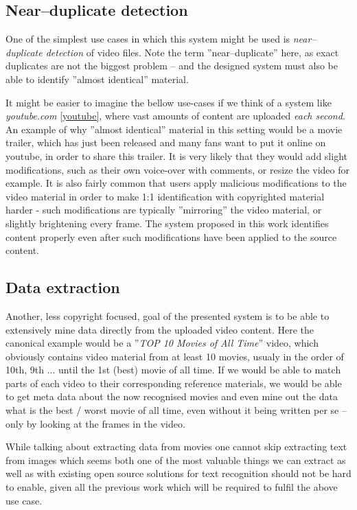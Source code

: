 \subsection{Near--duplicate detection}
One of the simplest use cases in which this system might be used is \textit{near--duplicate detection} of video files.
Note the term ''near--duplicate'' here, as exact duplicates are not the biggest problem -- and the designed system must also be able to identify ''almost identical'' material.

It might be easier to imagine the bellow use-cases if we think of a system like \textit{youtube.com} \ref{youtube}, where vast amounts of content are uploaded \textit{each second}. An example of why ''almost identical'' material in this setting would be a movie trailer, which has just been released and many fans want to put it online on youtube, in order to share this trailer. It is very likely that they would add slight modifications, such as their own voice-over with comments, or resize the video for example. It is also fairly common that users apply malicious modifications to the video material in order to make 1:1 identification with copyrighted material harder - such modifications are typically ''mirroring'' the video material, or slightly brightening every frame. The system proposed in this work identifies content properly even after such modifications have been applied to the source content.

\subsection{Data extraction}

Another, less copyright focused, goal of the presented system is to be able to extensively mine data directly from the uploaded video content.
Here the canonical example would be a ''\textit{TOP 10 Movies of All Time}'' video, which obviously contains video material from at least 10 movies,
usualy in the order of 10th, 9th ... until the 1st (best) movie of all time. If we would be able to match parts of each video to their corresponding 
reference materials, we would be able to get meta data about the now recognised movies and even mine out the data what is the best / worst movie of all time,
even without it being written per se -- only by looking at the frames in the video. 

While talking about extracting data from movies one cannot skip extracting text from images which seems both one of the most valuable things we can extract as well as with existing open source solutions for text recognition should not be hard to enable, given all the previous work which will be required to fulfil the above use case.


